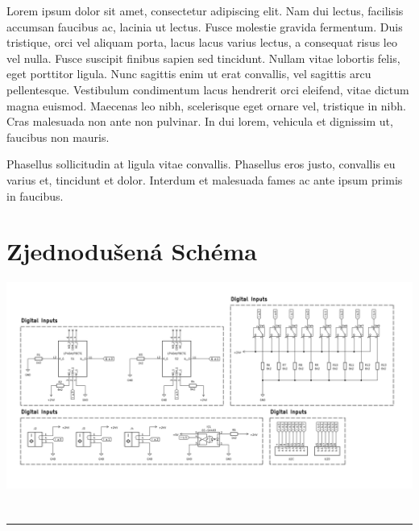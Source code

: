 \documentclass[a4paper, 10pt, twoside]{article}
\begin{document}
\begin{multicols}{2}
{	Lorem ipsum dolor sit amet, consectetur adipiscing elit. Nam dui lectus, facilisis accumsan faucibus ac, lacinia ut lectus. Fusce molestie gravida fermentum. Duis tristique, orci vel aliquam porta, lacus lacus varius lectus, a consequat risus leo vel nulla. Fusce suscipit finibus sapien sed tincidunt. Nullam vitae lobortis felis, eget porttitor ligula. Nunc sagittis enim ut erat convallis, vel sagittis arcu pellentesque. Vestibulum condimentum lacus hendrerit orci eleifend, vitae dictum magna euismod. Maecenas leo nibh, scelerisque eget ornare vel, tristique in nibh. Cras malesuada non ante non pulvinar. In dui lorem, vehicula et dignissim ut, faucibus non mauris.
	
	Phasellus sollicitudin at ligula vitae convallis. Phasellus eros justo, convallis eu varius et, tincidunt et dolor. Interdum et malesuada fames ac ante ipsum primis in faucibus.
	
}
\end{multicols}
{
	\section{Zjednodušená Schéma}
	
	\includegraphics[width=\textwidth]{test}
}
\restoregeometry
\newpage
\pagestyle{altstyle}
\setcounter{page}{2}
\setlength{\columnsep}{1.5cm}
{
	
	\fancyhfoffset[E,O]{0pt}
	
	\section*{}
	
	\begin{multicols}{2}
		\tableofcontents
		\thispagestyle{altstyle}
	\end{multicols}
	
	\noindent\rule{\textwidth}{0.5mm}
}
\end{document}
